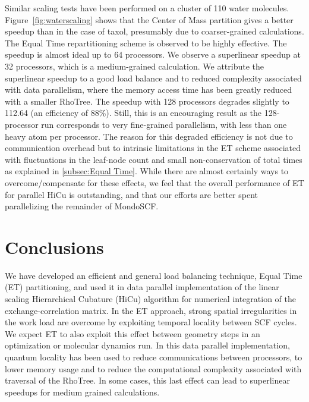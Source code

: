\commentoutA{\documentclass[prb,aps,twocolumn,twocolumngrid]{revtex4}}
\begin{document}
Similar scaling tests have been performed on a cluster of 110 water
molecules.  Figure~\ref{fig:waterscaling} shows that the Center of
Mass partition gives a better speedup than in the case of taxol,
presumably due to coarser-grained calculations.  The Equal Time
repartitioning scheme is observed to be highly effective.  The speedup
is almost ideal up to 64 processors. We observe a superlinear speedup
at 32 processors, which is a medium-grained calculation.  We attribute
the superlinear speedup to a good load balance and to reduced
complexity associated with data parallelism, where the memory access
time has been greatly reduced with a smaller RhoTree.  The speedup
with 128 processors degrades slightly to 112.64 (an efficiency of
88\%).  Still, this is an encouraging result as the 128-processor run
corresponds to very fine-grained parallelism, with less than one heavy
atom per processor. The reason for this degraded efficiency is not due
to communication overhead but to intrinsic limitations in the ET
scheme associated with fluctuations in the leaf-node count and small
non-conservation of total times as explained in
\ref{subsec:Equal Time}.  While there are almost certainly ways to
overcome/compensate for these effects, we feel that the overall
performance of ET for parallel HiCu is outstanding, and that our
efforts are better spent parallelizing the remainder of {\sc
MondoSCF}.

\section{Conclusions}
\label{sec:conclusions}


We have developed an efficient and general load balancing technique,
Equal Time (ET) partitioning, and used it in data parallel
implementation of the linear scaling Hierarchical Cubature (HiCu)
algorithm for numerical integration of the exchange-correlation
matrix.  In the ET approach, strong spatial irregularities in the work
load are overcome by exploiting temporal locality between SCF cycles.
We expect ET to also exploit this effect between geometry steps in an
optimization or molecular dynamics run.  In this data parallel
implementation, quantum locality has been used to reduce
communications between processors, to lower memory usage and to reduce
the computational complexity associated with traversal of the RhoTree.
In some cases, this last effect can lead to superlinear speedups for
medium grained calculations.
\end{document}
